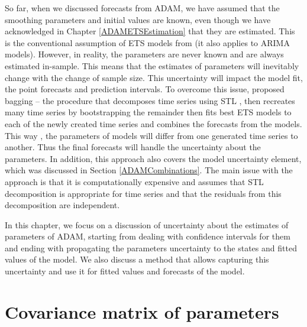 \documentclass[]{book}
\theoremstyle{definition}
\theoremstyle{definition}
\theoremstyle{definition}
\theoremstyle{definition}
\theoremstyle{remark}
\begin{document}
So far, when we discussed forecasts from ADAM, we have assumed that the smoothing parameters and initial values are known, even though we have acknowledged in Chapter \ref{ADAMETSEstimation} that they are estimated. This is the conventional assumption of ETS models from \citet{Hyndman2008b} (it also applies to ARIMA models). However, in reality, the parameters are never known and are always estimated in-sample. This means that the estimates of parameters will inevitably change with the change of sample size. This uncertainty will impact the model fit, the point forecasts and prediction intervals. To overcome this issue, \citet{Bergmeir2016} proposed bagging -- the procedure that decomposes time series using STL \citep{Cleveland1990}, then recreates many time series by bootstrapping the remainder then fits best ETS models to each of the newly created time series and combines the forecasts from the models. This way \citep[as was explained by][]{Petropoulos2018}, the parameters of models will differ from one generated time series to another. Thus the final forecasts will handle the uncertainty about the parameters. In addition, this approach also covers the model uncertainty element, which was discussed in Section \ref{ADAMCombinations}. The main issue with the approach is that it is computationally expensive and assumes that STL decomposition is appropriate for time series and that the residuals from this decomposition are independent.

In this chapter, we focus on a discussion of uncertainty about the estimates of parameters of ADAM, starting from dealing with confidence intervals for them and ending with propagating the parameters uncertainty to the states and fitted values of the model. We also discuss a method that allows capturing this uncertainty and use it for fitted values and forecasts of the model.

\hypertarget{ADAMUncertaintyVCOV}{%
\section{Covariance matrix of parameters}\label{ADAMUncertaintyVCOV}}
\end{document}
